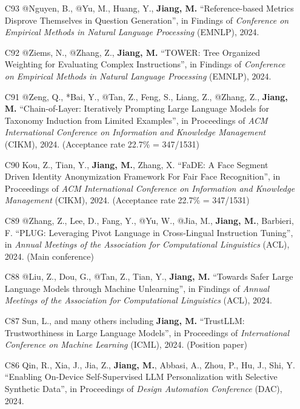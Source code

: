 \documentclass[10pt]{article}
\newenvironment{myindentpar}[1]%
{\begin{list}{}%
         {\setlength{\leftmargin}{#1}}%
         \item[]%
}
{\end{list}}
\newcounter{list}
\begin{document}
\begin{myindentpar}{0.00cm}
\begin{enumerate}[leftmargin=.5cm]
\item[C93] @Nguyen, B., @Yu, M., Huang, Y., \textbf{Jiang, M.} ``Reference-based Metrics Disprove Themselves in Question Generation'', in Findings of \textit{Conference on Empirical Methods in Natural Language Processing} (EMNLP), 2024.

\item[C92] @Ziems, N., @Zhang, Z., \textbf{Jiang, M.} ``TOWER: Tree Organized Weighting for Evaluating Complex Instructions'', in Findings of \textit{Conference on Empirical Methods in Natural Language Processing} (EMNLP), 2024.

\item[C91] @Zeng, Q., *Bai, Y., @Tan, Z., Feng, S., Liang, Z., @Zhang, Z., \textbf{Jiang, M.} ``Chain-of-Layer: Iteratively Prompting Large Language Models for Taxonomy Induction from Limited Examples'', in Proceedings of \textit{ACM International Conference on Information and Knowledge Management} (CIKM), 2024. (Acceptance rate 22.7\% = 347/1531)

\item[C90] Kou, Z., Tian, Y., \textbf{Jiang, M.}, Zhang, X. ``FaDE: A Face Segment Driven Identity Anonymization Framework For Fair Face Recognition'', in Proceedings of \textit{ACM International Conference on Information and Knowledge Management} (CIKM), 2024. (Acceptance rate 22.7\% = 347/1531)

\item[C89] @Zhang, Z., Lee, D., Fang, Y., @Yu, W., @Jia, M., \textbf{Jiang, M.}, Barbieri, F. ``PLUG: Leveraging Pivot Language in Cross-Lingual Instruction Tuning'', in \textit{Annual Meetings of the Association for Computational Linguistics} (ACL), 2024. (Main conference)

\item[C88] @Liu, Z., Dou, G., @Tan, Z., Tian, Y., \textbf{Jiang, M.} ``Towards Safer Large Language Models through Machine Unlearning'', in Findings of \textit{Annual Meetings of the Association for Computational Linguistics} (ACL), 2024.

\item[C87] Sun, L., and many others including \textbf{Jiang, M.} ``TrustLLM: Trustworthiness in Large Language Models'', in Proceedings of \textit{International Conference on Machine Learning} (ICML), 2024. (Position paper)
		
\item[C86] Qin, R., Xia, J., Jia, Z., \textbf{Jiang, M.}, Abbasi, A., Zhou, P., Hu, J., Shi, Y. ``Enabling On-Device Self-Supervised LLM Personalization with Selective Synthetic Data'', in Proceedings of \textit{Design Automation Conference} (DAC), 2024.


\end{enumerate}
\end{myindentpar}
\end{document}
